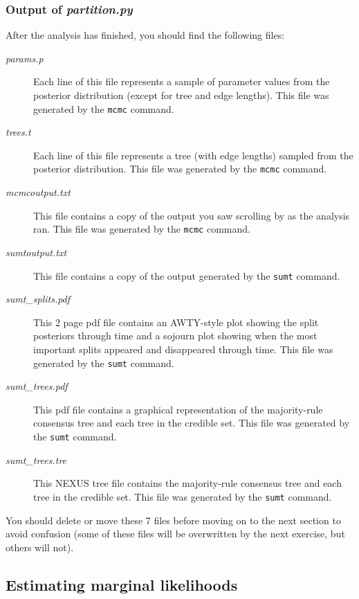\documentclass[10pt]{article}
\newcommand{\pathname}[1]{{\em #1}}				%
\newcommand{\cmd}[1]{{\tt \small #1}\index{#1}}	%
\begin{document}
\subsubsection{Output of \pathname{partition.py}}
After the analysis has finished, you should find the following files:
\begin{description}
\item[\pathname{params.p}] Each line of this file represents a sample of parameter values from the posterior distribution (except for tree and edge lengths). This file was generated by the \cmd{mcmc} command.
\item[\pathname{trees.t}] Each line of this file represents a tree (with edge lengths) sampled from the posterior distribution. This file was generated by the \cmd{mcmc} command.
\item[\pathname{mcmcoutput.txt}] This file contains a copy of the output you saw scrolling by as the analysis ran. This file was generated by the \cmd{mcmc} command.
\item[\pathname{sumtoutput.txt}] This file contains a copy of the output generated by the \cmd{sumt} command.
\item[\pathname{sumt\_splits.pdf}] This 2 page pdf file contains an AWTY-style plot showing the split posteriors through time and a sojourn plot showing when the most important splits appeared and disappeared through time. This file was generated by the \cmd{sumt} command.
\item[\pathname{sumt\_trees.pdf}] This pdf file contains a graphical representation of the majority-rule consensus tree and each tree in the credible set. This file was generated by the \cmd{sumt} command.
\item[\pathname{sumt\_trees.tre}] This NEXUS tree file contains the majority-rule consensus tree and each tree in the credible set. This file was generated by the \cmd{sumt} command.
\end{description}
You should delete or move these 7 files before moving on to the next section to avoid confusion (some of these files will be overwritten by the next exercise, but others will not).

\subsection{Estimating marginal likelihoods}\label{subsec:margliketutorial}
\end{document}
